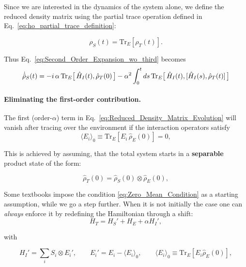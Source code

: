 \noindent
Since we are interested in the dynamics of the system alone, we define the reduced density matrix using the partial trace operation defined in Eq.~\eqref{eq:ho_partial_trace_definition}:

\begin{equation}
	\rho_S(t)= \mathrm{Tr}_E[\rho_T(t)].
	\label{eq:Reduced_Density_Matrix}
\end{equation}

Thus Eq.~\eqref{eq:Second_Order_Expansion_wo_third} becomes
\begin{equation}
	\dot{\hat{\rho}}_S(t) = -i \, \alpha \, \mathrm{Tr}_E\big[\,\hat{H}_I(t),\hat{\rho}_T(0)\,\big]
	- \alpha^2 \int_0^t ds\, \mathrm{Tr}_E \big[\,\hat{H}_I(t), [\hat{H}_I(s), \hat{\rho}_T(t)] \,\big] \notag
	\label{eq:Reduced_Density_Matrix_Evolution}
\end{equation}

\paragraph{Eliminating the first-order contribution.}

\noindent
The first (order-$\alpha$) term in Eq.~\eqref{eq:Reduced_Density_Matrix_Evolution} will vanish after tracing over the environment if the interaction operators satisfy 
\begin{equation}
	\langle E_i \rangle_0 \equiv \mathrm{Tr}_E[E_i \, \hat{\rho}_E(0)] = 0,
	\label{eq:Zero_Mean_Condition}
\end{equation}

\noindent
This is achieved by assuming, that the total system starts in a \textbf{separable} product state of the form:

\begin{equation}
	\hat{\rho}_T(0) = \hat{\rho}_S(0) \otimes \hat{\rho}_E(0),
	\label{eq:Initial_Product_State}
\end{equation}

\noindent
Some textbooks impose the condition \eqref{eq:Zero_Mean_Condition} as a starting assumption, while we go a step further. When it is not initially the case one can \emph{always} enforce it by redefining the Hamiltonian through a shift:
\begin{equation}
	H_T = H_S' + H_E + \alpha H_I',
	\label{eq:Shifted_Total_Hamiltonian}
\end{equation}

\noindent
with

\begin{equation}
	H_I' = \sum_i S_i \otimes E_i', \qquad E_i' = E_i - \langle E_i \rangle_0, \qquad \langle E_i \rangle_0 \equiv \mathrm{Tr}_E[E_i \hat{\rho}_E(0)],
	\label{eq:Shifted_Interaction_Hamiltonian}
\end{equation}

